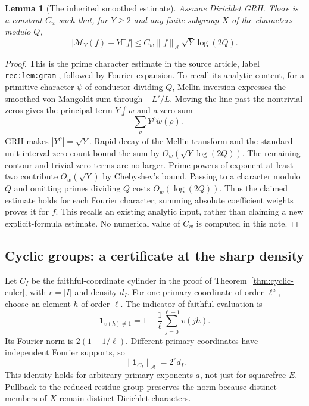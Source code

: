 \documentclass[11pt]{article}
\newtheorem{lemma}[theorem]{Lemma}
\theoremstyle{definition}
\theoremstyle{remark}
\newcommand{\E}{\mathbb E}
\newcommand{\one}{\mathbf1}
\begin{document}
\begin{lemma}[The inherited smoothed estimate]\label{lem:smoothed}
Assume Dirichlet GRH. There is a constant $C_w$ such that, for $Y\ge2$ and any finite subgroup $X$ of the characters modulo $Q$,
\[
 \left|\mathcal M_Y(f)-Y\E f\right|
 \le C_w\|f\|_{\mathcal A}\sqrt Y\log(2Q).
\]
\end{lemma}
\begin{proof}
This is the prime character estimate in the source article, label \texttt{rec:lem:gram} \cite{rec}, followed by Fourier expansion. To recall its analytic content, for a primitive character $\psi$ of conductor dividing $Q$, Mellin inversion expresses the smoothed von Mangoldt sum through $-L'/L$. Moving the line past the nontrivial zeros gives the principal term $Y\int w$ and a zero sum
\[
 -\sum_\rho Y^\rho\widetilde w(\rho).
\]
GRH makes $|Y^\rho|=\sqrt Y$. Rapid decay of the Mellin transform and the standard unit-interval zero count bound the sum by $O_w(\sqrt Y\log(2Q))$. The remaining contour and trivial-zero terms are no larger. Prime powers of exponent at least two contribute $O_w(\sqrt Y)$ by Chebyshev's bound. Passing to a character modulo $Q$ and omitting primes dividing $Q$ costs $O_w(\log(2Q))$. Thus the claimed estimate holds for each Fourier character; summing absolute coefficient weights proves it for $f$. This recalls an existing analytic input, rather than claiming a new explicit-formula estimate. No numerical value of $C_w$ is computed in this note.
\end{proof}

\subsection{Cyclic groups: a certificate at the sharp density}
Let $C_I$ be the faithful-coordinate cylinder in the proof of Theorem~\ref{thm:cyclic-euler}, with $r=|I|$ and density $d_I$. For one primary coordinate of order $\ell^a$, choose an element $h$ of order $\ell$. The indicator of faithful evaluation is
\[
 \one_{v(h)\ne1}
  =1-\frac1\ell\sum_{j=0}^{\ell-1}v(jh).
\]
Its Fourier norm is $2(1-1/\ell)$. Different primary coordinates have independent Fourier supports, so
\begin{equation}\label{eq:cyclic-norm}
 \|\one_{C_I}\|_{\mathcal A}=2^r d_I.
\end{equation}
This identity holds for arbitrary primary exponents $a$, not just for squarefree $E$. Pullback to the reduced residue group preserves the norm because distinct members of $X$ remain distinct Dirichlet characters.
\end{document}
